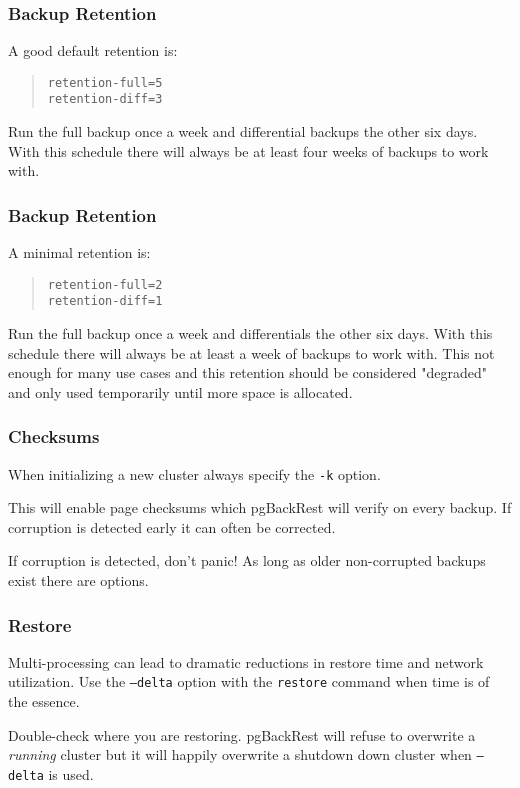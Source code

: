 \begin{frame}[fragile]
    \frametitle{Backup Retention}

    A good default retention is:

    \begin{quote}\begin{verbatim}
retention-full=5
retention-diff=3
    \end{verbatim}\end{quote}\vspace{-1em}

    Run the full backup once a week and differential backups the other six days.
    \vspace{1em}
    With this schedule there will always be at least four weeks of backups to work with.
\end{frame}

\begin{frame}[fragile]
    \frametitle{Backup Retention}

    A minimal retention is:

    \begin{quote}\begin{verbatim}
retention-full=2
retention-diff=1
    \end{verbatim}\end{quote}\vspace{-1em}

    Run the full backup once a week and differentials the other six days.
    \vspace{1em}
    With this schedule there will always be at least a week of backups to work with.  This not enough for many use cases and this retention should be considered "degraded" and only used temporarily until more space is allocated.
\end{frame}

\begin{frame}
    \frametitle{Checksums}

    When initializing a new cluster always specify the \texttt{-k} option.

    This will enable page checksums which pgBackRest will verify on every backup.  If corruption is detected early it can often be corrected.

    If corruption is detected, don't panic!  As long as older non-corrupted backups exist there are options.
\end{frame}

\begin{frame}
    \frametitle{Restore}

    Multi-processing can lead to dramatic reductions in restore time and network utilization.  Use the \texttt{--delta} option with the \texttt{restore} command when time is of the essence.

    Double-check where you are restoring.  pgBackRest will refuse to overwrite a \textit{running} cluster but it will happily overwrite a shutdown down cluster when \texttt{--delta} is used.
\end{frame}

